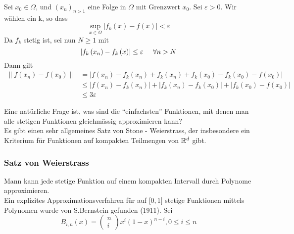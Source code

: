 \begin{beweis}{4.31}
Sei $x_0\in\Omega$, und $\left( x_n\right)_{n>1}$ eine Folge in $\Omega$ mit Grenzwert $x_0$. Sei $\varepsilon>0$. Wir wählen ein k, so dass
\[\mathop {\sup }\limits_{x \in \Omega } \left| {{f_k}(x) - f(x)} \right| < \varepsilon \]
Da $f_k$ stetig ist, sei nun $N\geq 1$ mit
\[\left| {{f_k}\left( {{x_n}} \right) - {f_k}\left( x \right)} \right| \le \varepsilon \hspace{5mm}\forall n > N\]
Dann gilt
\begin{align*}
\left\| {f\left( {{x_n}} \right) - f\left( {{x_0}} \right)} \right\| &= \left| {f\left( {{x_n}} \right) - {f_k}\left( {{x_n}} \right) + {f_k}\left( {{x_n}} \right) + {f_k}\left( {{x_0}} \right) - {f_k}\left( {{x_0}} \right) - f\left( {{x_0}} \right)} \right|\\
 &\le \left| {f\left( {{x_n}} \right) - {f_k}\left( {{x_n}} \right)} \right| + \left| {{f_k}\left( {{x_n}} \right) - {f_k}\left( {{x_0}} \right)} \right| + \left| {{f_k}\left( {{x_0}} \right) - f\left( {{x_0}} \right)} \right|\\
 &\le 3\varepsilon
\end{align*}
\end{beweis}
Eine natürliche Frage ist, was sind die ``einfachsten'' Funktionen, mit denen man alle stetigen Funktionen gleichmässig approximieren kann?\\
Es gibt einen sehr allgemeines Satz von Stone - Weierstrass, der insbesondere ein Kriterium für Funktionen auf kompakten Teilmengen von $\mathbb{R}^d$ gibt.
\subsubsection*{Satz von Weierstrass}
Mann kann jede stetige Funktion auf einem kompakten Intervall durch Polynome approximieren. \\

Ein explizites Approximationsverfahren für auf $\lbrack 0,1\rbrack$ stetige Funktionen mittels Polynomen wurde von S.Bernstein gefunden (1911). Sei
\[{B_{i,n}}(x) = \left( {\begin{array}{*{20}{c}}
n\\
i
\end{array}} \right){x^i}{\left( {1 - x} \right)^{n - i}},0 \le i \le n\]

\begin{center}
\end{center}

